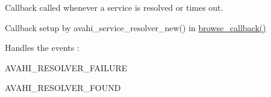 \-Callback called whenever a service is resolved or times out. 

\-Callback setup by avahi\-\_\-service\-\_\-resolver\-\_\-new() in \hyperlink{avahi-discovery_8c_a2b331683eee5e4914140744a173bc068}{browse\-\_\-callback()}

\-Handles the events \-:
\begin{DoxyItemize}
\item \-A\-V\-A\-H\-I\-\_\-\-R\-E\-S\-O\-L\-V\-E\-R\-\_\-\-F\-A\-I\-L\-U\-R\-E
\item \-A\-V\-A\-H\-I\-\_\-\-R\-E\-S\-O\-L\-V\-E\-R\-\_\-\-F\-O\-U\-N\-D 
\end{DoxyItemize}